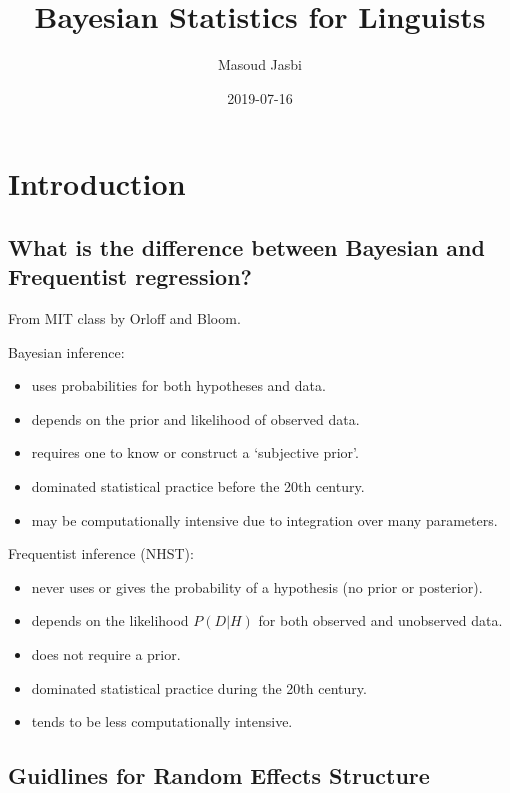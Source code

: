 \documentclass[]{book}
\title{Bayesian Statistics for Linguists}
\author{Masoud Jasbi}
\date{2019-07-16}
\providecommand{\tightlist}{%
  \setlength{\itemsep}{0pt}\setlength{\parskip}{0pt}}
\begin{document}
\maketitle

{
\setcounter{tocdepth}{1}
\tableofcontents
}
\hypertarget{introduction}{%
\chapter{Introduction}\label{introduction}}

\hypertarget{what-is-the-difference-between-bayesian-and-frequentist-regression}{%
\section{What is the difference between Bayesian and Frequentist regression?}\label{what-is-the-difference-between-bayesian-and-frequentist-regression}}

From MIT class by Orloff and Bloom.

Bayesian inference:

\begin{itemize}
\tightlist
\item
  uses probabilities for both hypotheses and data.
\item
  depends on the prior and likelihood of observed data.
\item
  requires one to know or construct a `subjective prior'.
\item
  dominated statistical practice before the 20th century.
\item
  may be computationally intensive due to integration over many parameters.
\end{itemize}

Frequentist inference (NHST):

\begin{itemize}
\tightlist
\item
  never uses or gives the probability of a hypothesis (no prior or posterior).
\item
  depends on the likelihood \(P(D|H)\) for both observed and unobserved data.
\item
  does not require a prior.
\item
  dominated statistical practice during the 20th century.
\item
  tends to be less computationally intensive.
\end{itemize}

\hypertarget{guidlines-for-random-effects-structure}{%
\section{Guidlines for Random Effects Structure}\label{guidlines-for-random-effects-structure}}
\end{document}
